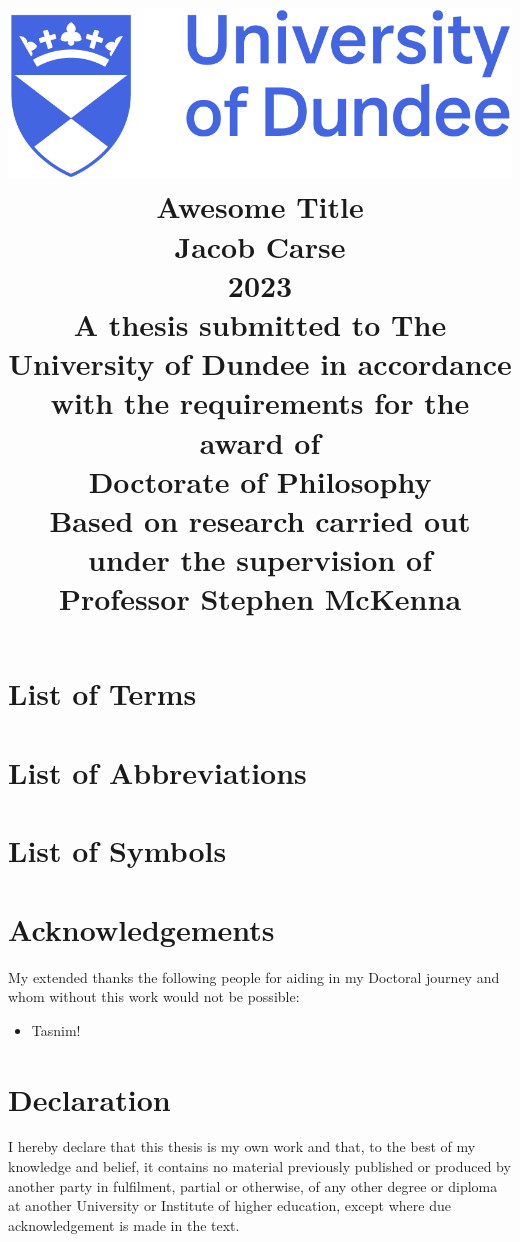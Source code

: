 \documentclass[12pt]{report}
\title{
	{\includegraphics[scale=0.4]{dundee_logo.png}}\\
	\vspace{15mm}
	{Awesome Title}\\
	\vspace{5mm}
	{\Large Jacob Carse}\\
	{\Large 2023}\\
	\vspace{5mm}
	{\normalsize A thesis submitted to The University of Dundee in accordance with the requirements for the award of}\\
	{\large Doctorate of Philosophy}\\
	\vspace{5mm}
	{\normalsize Based on research carried out under the supervision of}\\
	{\large Professor Stephen McKenna}
}
\date{\vspace{-5ex}}
\author{}
\begin{document}
	
	\maketitle
	
	\renewcommand{\contentsname}{Table of Contents}
	\tableofcontents
	
	\newpage
	\listoffigures
	
	\newpage
	\listoftables
	
	\newpage
	\chapter*{List of Terms}
	
	
	\newpage
	\chapter*{List of Abbreviations}
	
	
	\newpage
	\chapter*{List of Symbols}
	
	
	\newpage
	\chapter*{Acknowledgements}
	My extended thanks the following people for aiding in my Doctoral journey and whom without this work would not be possible:
	
	\begin{itemize}
		\item Tasnim!
	\end{itemize}
	
	\newpage
	\chapter*{Declaration}
	I hereby declare that this thesis is my own work and that, to the best of my knowledge and belief, it contains no material previously published or produced by another party in fulfilment, partial or otherwise, of any other degree or diploma at another University or Institute of higher education, except where due acknowledgement is made in the text.
	
\end{document}
